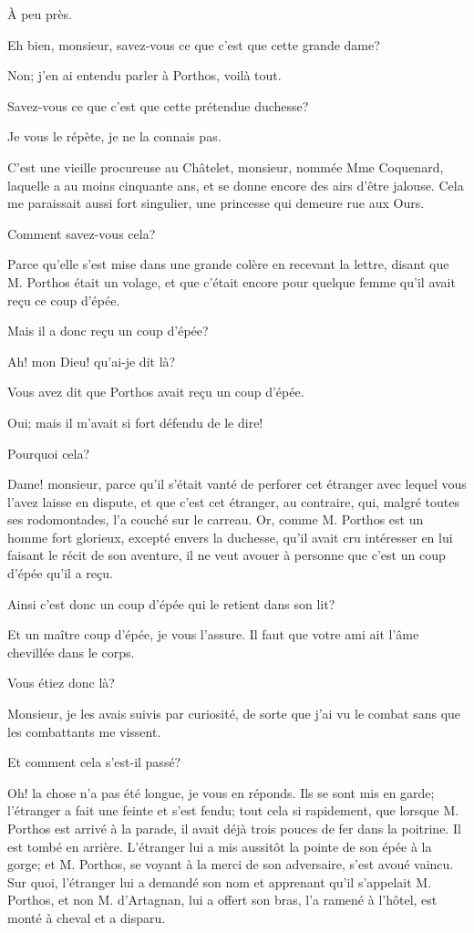 \speak  À peu près. 

\speak  Eh bien, monsieur, savez-vous ce que c'est que cette grande dame? 

\speak  Non; j'en ai entendu parler à Porthos, voilà tout. 

\speak  Savez-vous ce que c'est que cette prétendue duchesse? 

\speak  Je vous le répète, je ne la connais pas. 

\speak  C'est une vieille procureuse au Châtelet, monsieur, nommée Mme Coquenard, laquelle a au moins cinquante ans, et se donne encore des airs d'être jalouse. Cela me paraissait aussi fort singulier, une princesse qui demeure rue aux Ours. 

\speak  Comment savez-vous cela? 

\speak  Parce qu'elle s'est mise dans une grande colère en recevant la lettre, disant que M. Porthos était un volage, et que c'était encore pour quelque femme qu'il avait reçu ce coup d'épée. 

\speak  Mais il a donc reçu un coup d'épée? 

\speak  Ah! mon Dieu! qu'ai-je dit là? 

\speak  Vous avez dit que Porthos avait reçu un coup d'épée. 

\speak  Oui; mais il m'avait si fort défendu de le dire! 

\speak  Pourquoi cela? 

\speak  Dame! monsieur, parce qu'il s'était vanté de perforer cet étranger avec lequel vous l'avez laisse en dispute, et que c'est cet étranger, au contraire, qui, malgré toutes ses rodomontades, l'a couché sur le carreau. Or, comme M. Porthos est un homme fort glorieux, excepté envers la duchesse, qu'il avait cru intéresser en lui faisant le récit de son aventure, il ne veut avouer à personne que c'est un coup d'épée qu'il a reçu. 

\speak  Ainsi c'est donc un coup d'épée qui le retient dans son lit? 

\speak  Et un maître coup d'épée, je vous l'assure. Il faut que votre ami ait l'âme chevillée dans le corps. 

\speak  Vous étiez donc là? 

\speak  Monsieur, je les avais suivis par curiosité, de sorte que j'ai vu le combat sans que les combattants me vissent. 

\speak  Et comment cela s'est-il passé? 

\speak  Oh! la chose n'a pas été longue, je vous en réponds. Ils se sont mis en garde; l'étranger a fait une feinte et s'est fendu; tout cela si rapidement, que lorsque M. Porthos est arrivé à la parade, il avait déjà trois pouces de fer dans la poitrine. Il est tombé en arrière. L'étranger lui a mis aussitôt la pointe de son épée à la gorge; et M. Porthos, se voyant à la merci de son adversaire, s'est avoué vaincu. Sur quoi, l'étranger lui a demandé son nom et apprenant qu'il s'appelait M. Porthos, et non M. d'Artagnan, lui a offert son bras, l'a ramené à l'hôtel, est monté à cheval et a disparu. 

